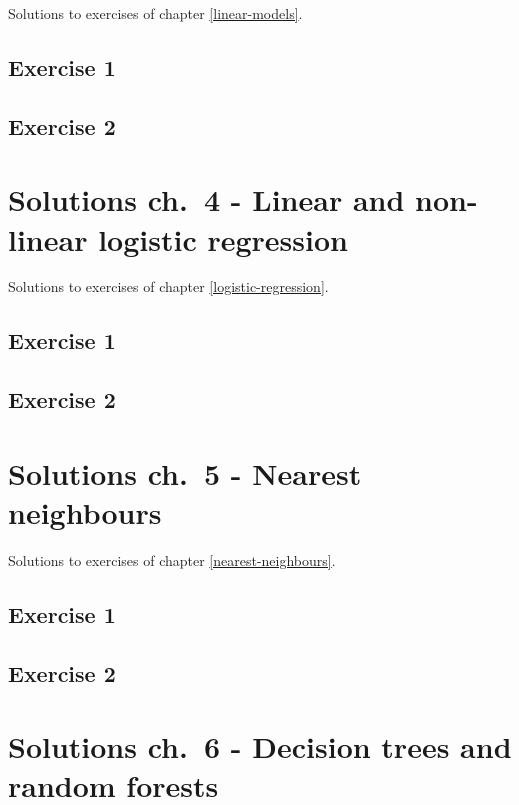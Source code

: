 \documentclass[]{book}
\theoremstyle{definition}
\theoremstyle{definition}
\theoremstyle{definition}
\theoremstyle{remark}
\begin{document}
Solutions to exercises of chapter \ref{linear-models}.

\section{Exercise 1}\label{exercise-1}

\section{Exercise 2}\label{exercise-2}

\chapter{Solutions ch.~4 - Linear and non-linear logistic
regression}\label{solutions-logistic-regression}

Solutions to exercises of chapter \ref{logistic-regression}.

\section{Exercise 1}\label{exercise-1-1}

\section{Exercise 2}\label{exercise-2-1}

\chapter{Solutions ch.~5 - Nearest
neighbours}\label{solutions-nearest-neighbours}

Solutions to exercises of chapter \ref{nearest-neighbours}.

\section{Exercise 1}\label{exercise-1-2}

\section{Exercise 2}\label{exercise-2-2}

\chapter{Solutions ch.~6 - Decision trees and random
forests}\label{solutions-decision-trees}
\end{document}
